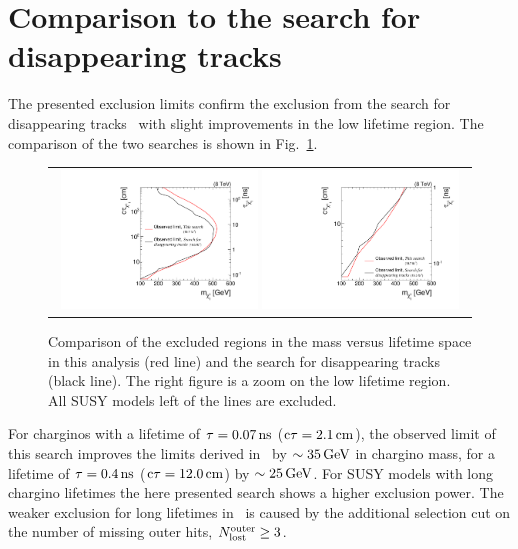 \section{Comparison to the search for disappearing tracks}
The presented exclusion limits confirm the exclusion from the search for disappearing tracks~\cite{bib:CMS:DT_8TeV} with slight improvements in the low lifetime region.
The comparison of the two searches is shown in Fig.~\ref{fig:Comparison2dLimit}.
\begin{figure}[!b]
  \centering 
  \begin{tabular}{c}
    \includegraphics[width=0.48\textwidth]{figures/analysis/Interpretation/Comparison2dLimits_largerRange.pdf}  
    \hspace{0.03\textwidth}
    \includegraphics[width=0.48\textwidth]{figures/analysis/Interpretation/Comparison2dLimits_SmallRange.pdf} 
  \end{tabular}
  \caption{Comparison of the excluded regions in the mass versus lifetime space in this analysis (red line) and the search for disappearing tracks~\cite{bib:CMS:DT_8TeV} (black line). 
           The right figure is a zoom on the low lifetime region. All SUSY models left of the lines are excluded.}
  \label{fig:Comparison2dLimit}
\end{figure} 

For charginos with a lifetime of $\tau=0.07\,\text{ns}$ ($\text{c}\tau=2.1\,\text{cm}$), the observed limit of this search improves the limits derived in~\cite{bib:CMS:DT_8TeV} by $\sim35\,\text{Ge}\kern-0.06667em\text{V}$ in chargino mass, for a lifetime of $\tau=0.4\,\text{ns}$ ($\text{c}\tau=12.0\,\text{cm}$) by $\sim25\,\text{Ge}\kern-0.06667em\text{V}$. 
For SUSY models with long chargino lifetimes the here presented search shows a higher exclusion power.
The weaker exclusion for long lifetimes in~\cite{bib:CMS:DT_8TeV} is caused by the additional selection cut on the number of missing outer hits, $N_{\text{lost}}^{\text{outer}}\geq3$.\\

